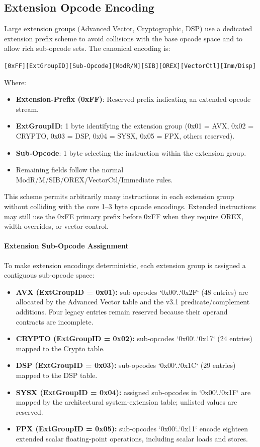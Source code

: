 \documentclass[11pt]{article}
\begin{document}
\subsection{Extension Opcode Encoding}

Large extension groups (Advanced Vector, Cryptographic, DSP) use a dedicated extension prefix scheme to avoid collisions with the base opcode space and to allow rich sub-opcode sets. The canonical encoding is:

\begin{center}
\texttt{[0xFF][ExtGroupID][Sub-Opcode][ModR/M][SIB][OREX][VectorCtl][Imm/Disp]}
\end{center}

Where:
\begin{itemize}
    \item \textbf{Extension-Prefix (0xFF)}: Reserved prefix indicating an extended opcode stream.
    \item \textbf{ExtGroupID}: 1 byte identifying the extension group (0x01 = AVX, 0x02 = CRYPTO, 0x03 = DSP, 0x04 = SYSX, 0x05 = FPX, others reserved).
    \item \textbf{Sub-Opcode}: 1 byte selecting the instruction within the extension group.
    \item Remaining fields follow the normal ModR/M/SIB/OREX/VectorCtl/Immediate rules.
\end{itemize}

This scheme permits arbitrarily many instructions in each extension group without colliding with the core 1--3 byte opcode encodings. Extended instructions may still use the 0xFE primary prefix before 0xFF when they require OREX, width overrides, or vector control.

\paragraph{Extension Sub-Opcode Assignment}
To make extension encodings deterministic, each extension group is assigned a contiguous sub-opcode space: 
\begin{itemize}
    \item \textbf{AVX (ExtGroupID = 0x01):} sub-opcodes `0x00`..`0x2F` (48 entries) are allocated by the Advanced Vector table and the v3.1 predicate/complement additions. Four legacy entries remain reserved because their operand contracts are incomplete.
    \item \textbf{CRYPTO (ExtGroupID = 0x02):} sub-opcodes `0x00`..`0x17` (24 entries) mapped to the Crypto table.
    \item \textbf{DSP (ExtGroupID = 0x03):} sub-opcodes `0x00`..`0x1C` (29 entries) mapped to the DSP table.
    \item \textbf{SYSX (ExtGroupID = 0x04):} assigned sub-opcodes in `0x00`..`0x1F` are mapped by the architectural system-extension table; unlisted values are reserved.
    \item \textbf{FPX (ExtGroupID = 0x05):} sub-opcodes `0x00`..`0x11` encode eighteen extended scalar floating-point operations, including scalar loads and stores.
\end{itemize}
\end{document}
